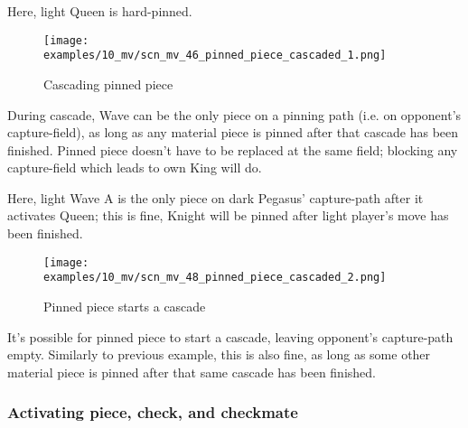 Here, light Queen is hard-pinned.

\clearpage %

\vspace*{-2.1\baselineskip}
\noindent
\begin{figure}[!h]
\texttt{[image: examples/10\_mv/scn\_mv\_46\_pinned\_piece\_cascaded\_1.png]}
\vspace*{-1.3\baselineskip}
\caption{Cascading pinned piece}
\label{fig:scn_mv_46_pinned_piece_cascaded_1}
\end{figure}

\vspace*{-0.5\baselineskip}
During cascade, Wave can be the only piece on a pinning path (i.e. on opponent's
capture-field), as long as any material piece is pinned after that cascade has been
finished. Pinned piece doesn't have to be replaced at the same field; blocking any
capture-field which leads to own King will do.

Here, light Wave A is the only piece on dark Pegasus' capture-path after it activates
Queen; this is fine, Knight will be pinned after light player's move has been finished.

\clearpage %

\vspace*{-2.3\baselineskip}
\noindent
\begin{figure}[!h]
\texttt{[image: examples/10\_mv/scn\_mv\_48\_pinned\_piece\_cascaded\_2.png]}
\caption{Pinned piece starts a cascade}
\label{fig:scn_mv_48_pinned_piece_cascaded_2}
\end{figure}

It's possible for pinned piece to start a cascade, leaving opponent's capture-path
empty. Similarly to previous example, this is also fine, as long as some other
material piece is pinned after that same cascade has been finished.

\clearpage %

\subsubsection*{Activating piece, check, and checkmate}
\label{sec:Miranda's veil/Wave/Cascading Waves/Activating piece, check, and checkmate}

